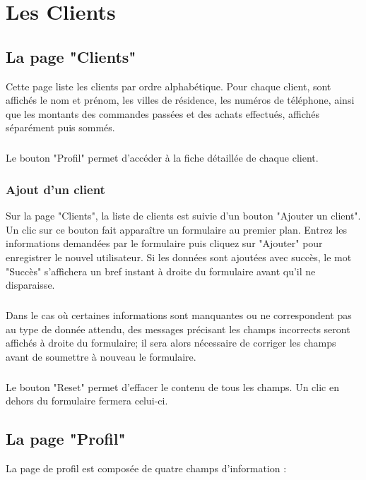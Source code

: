 \chapter{Les Clients}

\section{La page "Clients"}
Cette page liste les clients par ordre alphabétique. Pour chaque client, sont
affichés le nom et prénom, les villes de résidence, les numéros de téléphone, 
ainsi que les montants des commandes passées et des achats effectués, affichés
séparément puis sommés.

\paragraph{}
Le bouton "Profil" permet d'accéder à la fiche détaillée de chaque client.

\subsection{Ajout d'un client}
Sur la page "Clients", la liste de clients est suivie d'un bouton
"Ajouter un client". Un clic sur ce bouton fait apparaître un formulaire au
premier plan. Entrez les informations demandées par le formulaire puis cliquez
sur "Ajouter" pour enregistrer le nouvel utilisateur. Si les données sont
ajoutées avec succès, le mot "Succès" s'affichera un bref instant à droite du
formulaire avant qu'il ne disparaisse.

\paragraph{}
Dans le cas où certaines informations
sont manquantes ou ne correspondent pas au type de donnée attendu, des messages
précisant les champs incorrects seront affichés à droite du formulaire; il sera
alors nécessaire de corriger les champs avant de soumettre à nouveau le
formulaire.

\paragraph{}
Le bouton "Reset" permet d'effacer le contenu de tous les champs. Un clic en
dehors du formulaire fermera celui-ci.

\section{La page "Profil"}
La page de profil est composée de quatre champs d'information :

